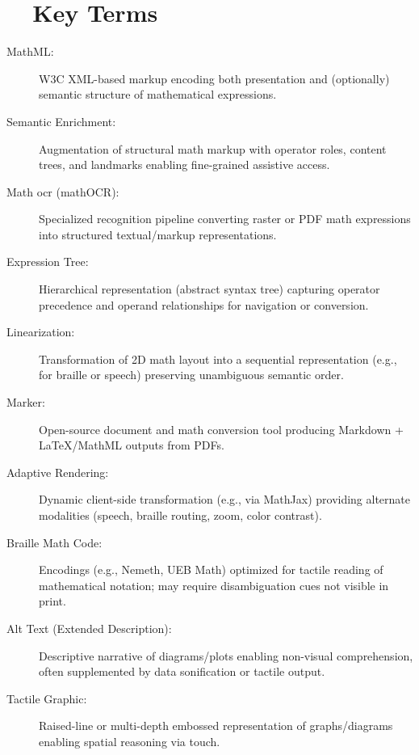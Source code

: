 \section{~~Key Terms}\label{ch11:sec:key-terms}
\begin{description}
	\item[MathML:] W3C XML-based markup encoding both presentation and (optionally) semantic structure of mathematical expressions.\supercite{W3CMathML4}
	\item[Semantic Enrichment:] Augmentation of structural math markup with operator roles, content trees, and  landmarks enabling fine-grained assistive access.\supercite{IBMSemanticAI, OntotextSemanticAI}
	\item[Math \gls{ocr} (mathOCR):] Specialized recognition pipeline converting raster or PDF math expressions into structured textual/markup representations.\supercite{DeepLearningOCROverview}
	\item[Expression Tree:] Hierarchical representation (abstract syntax tree) capturing operator precedence and operand relationships for navigation or conversion.
	\item[Linearization:] Transformation of 2D math layout into a sequential representation (e.g., for braille or speech) preserving unambiguous semantic order.
	\item[Marker:] Open-source document and math conversion tool producing Markdown + LaTeX/MathML outputs from PDFs.\supercite{Marker, MarkerDocs}
	\item[Adaptive Rendering:] Dynamic client-side transformation (e.g., via MathJax) providing alternate modalities (speech, braille routing, zoom, color contrast).
	\item[Braille Math Code:] Encodings (e.g., Nemeth, UEB Math) optimized for tactile reading of mathematical notation; may require disambiguation cues not visible in print.
	\item[Alt Text (Extended Description):] Descriptive narrative of diagrams/plots enabling non-visual comprehension, often supplemented by data sonification or tactile output.
	\item[Tactile Graphic:] Raised-line or multi-depth embossed representation of graphs/diagrams enabling spatial reasoning via touch.
\end{description}

